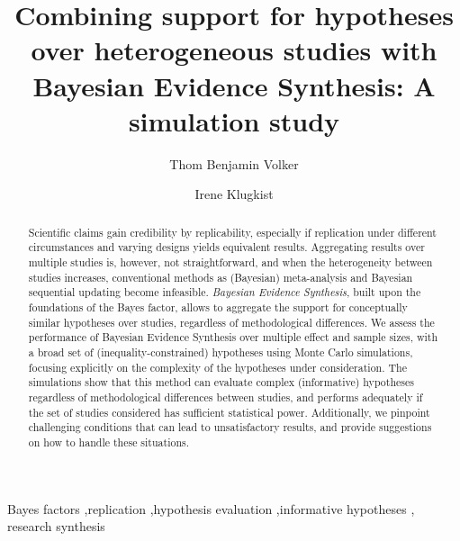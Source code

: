 \documentclass[
  authoryear,
  preprint,
  5p,
  twocolumn]{elsarticle}
\begin{document}
\begin{frontmatter}
\title{Combining support for hypotheses over heterogeneous studies with
Bayesian Evidence Synthesis: A simulation study}
\author[1]{Thom Benjamin Volker%
%
}
\author[1]{Irene Klugkist%
%
}



        
\begin{abstract}
Scientific claims gain credibility by replicability, especially if
replication under different circumstances and varying designs yields
equivalent results. Aggregating results over multiple studies is,
however, not straightforward, and when the heterogeneity between studies
increases, conventional methods as (Bayesian) meta-analysis and Bayesian
sequential updating become infeasible. \emph{Bayesian Evidence
Synthesis}, built upon the foundations of the Bayes factor, allows to
aggregate the support for conceptually similar hypotheses over studies,
regardless of methodological differences. We assess the performance of
Bayesian Evidence Synthesis over multiple effect and sample sizes, with
a broad set of (inequality-constrained) hypotheses using Monte Carlo
simulations, focusing explicitly on the complexity of the hypotheses
under consideration. The simulations show that this method can evaluate
complex (informative) hypotheses regardless of methodological
differences between studies, and performs adequately if the set of
studies considered has sufficient statistical power. Additionally, we
pinpoint challenging conditions that can lead to unsatisfactory results,
and provide suggestions on how to handle these situations.
\end{abstract}





\begin{keyword}
    Bayes factors \sep replication \sep hypothesis
evaluation \sep informative hypotheses \sep 
    research synthesis
\end{keyword}
\end{frontmatter}
    \ifdefined\Shaded\renewenvironment{Shaded}{\begin{tcolorbox}[borderline west={3pt}{0pt}{shadecolor}, enhanced, interior hidden, boxrule=0pt, breakable, frame hidden, sharp corners]}{\end{tcolorbox}}\fi
\end{document}
